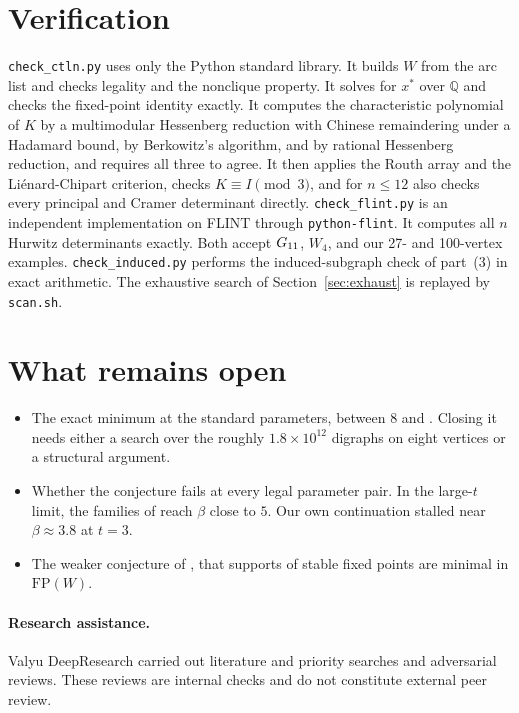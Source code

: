 \documentclass[11pt]{amsart}
\theoremstyle{remark}
\begin{document}
\section{Verification}\label{sec:verify}

\texttt{check\_ctln.py} uses only the Python standard library. It builds $W$ from the arc list and checks legality and the nonclique property. It solves for $x^*$ over $\mathbb Q$ and checks the fixed-point identity exactly. It computes the characteristic polynomial of $K$ by a multimodular Hessenberg reduction with Chinese remaindering under a Hadamard bound, by Berkowitz's algorithm, and by rational Hessenberg reduction, and requires all three to agree. It then applies the Routh array and the Li\'enard-Chipart criterion, checks $K\equiv I\pmod3$, and for $n\le12$ also checks every principal and Cramer determinant directly. \texttt{check\_flint.py} is an independent implementation on FLINT through \texttt{python-flint}. It computes all $n$ Hurwitz determinants exactly. Both accept $G_{11}$, $W_4$, and our 27- and 100-vertex examples. \texttt{check\_induced.py} performs the induced-subgraph check of part~(3) in exact arithmetic. The exhaustive search of Section~\ref{sec:exhaust} is replayed by \texttt{scan.sh}.

\section{What remains open}

\begin{itemize}
\item The exact minimum at the standard parameters, between $8$ and \NSMALL. Closing it needs either a search over the roughly $1.8\times10^{12}$ digraphs on eight vertices or a structural argument. \SPARSENOTE
\item Whether the conjecture fails at every legal parameter pair. In the large-$t$ limit, the families of \cite{CLTNrepo} reach $\beta$ close to $5$. Our own continuation stalled near $\beta\approx3.8$ at $t=3$.
\item The weaker conjecture of \cite{CGM2024}, that supports of stable fixed points are minimal in $\mathrm{FP}(W)$.
\end{itemize}

\paragraph{Research assistance.}
Valyu DeepResearch carried out literature and priority searches and adversarial reviews. These reviews are internal checks and do not constitute external peer review.



\end{document}
